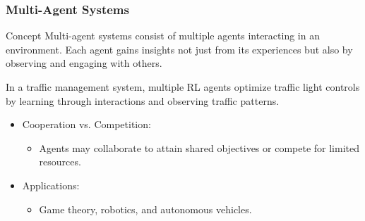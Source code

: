 \documentclass{beamer}
\begin{document}
\begin{frame}[fragile]
    \frametitle{Multi-Agent Systems}

    \begin{block}{Concept}
        Multi-agent systems consist of multiple agents interacting in an environment. Each agent gains insights not just from its experiences but also by observing and engaging with others.
    \end{block}
    
    \begin{example}
        In a traffic management system, multiple RL agents optimize traffic light controls by learning through interactions and observing traffic patterns.
    \end{example}

    \begin{itemize}
        \item Cooperation vs. Competition:
        \begin{itemize}
            \item Agents may collaborate to attain shared objectives or compete for limited resources.
        \end{itemize}
        \item Applications:
        \begin{itemize}
            \item Game theory, robotics, and autonomous vehicles.
        \end{itemize}
    \end{itemize}
\end{frame}
\end{document}
